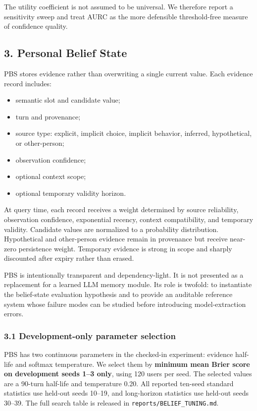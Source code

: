 The utility coefficient is not assumed to be universal. We therefore
report a sensitivity sweep and treat AURC as the more defensible
threshold-free measure of confidence quality.

\subsection{3. Personal Belief State}\label{personal-belief-state}

PBS stores evidence rather than overwriting a single current value. Each
evidence record includes:

\begin{itemize}
\tightlist
\item
  semantic slot and candidate value;
\item
  turn and provenance;
\item
  source type: explicit, implicit choice, implicit behavior, inferred,
  hypothetical, or other-person;
\item
  observation confidence;
\item
  optional context scope;
\item
  optional temporary validity horizon.
\end{itemize}

At query time, each record receives a weight determined by source
reliability, observation confidence, exponential recency, context
compatibility, and temporary validity. Candidate values are normalized
to a probability distribution. Hypothetical and other-person evidence
remain in provenance but receive near-zero persistence weight. Temporary
evidence is strong in scope and sharply discounted after expiry rather
than erased.

PBS is intentionally transparent and dependency-light. It is not
presented as a replacement for a learned LLM memory module. Its role is
twofold: to instantiate the belief-state evaluation hypothesis and to
provide an auditable reference system whose failure modes can be studied
before introducing model-extraction errors.

\subsubsection{3.1 Development-only parameter
selection}\label{development-only-parameter-selection}

PBS has two continuous parameters in the checked-in experiment: evidence
half-life and softmax temperature. We select them by \textbf{minimum
mean Brier score on development seeds 1--3 only}, using 120 users per
seed. The selected values are a 90-turn half-life and temperature 0.20.
All reported ten-seed standard statistics use held-out seeds 10--19, and
long-horizon statistics use held-out seeds 30--39. The full search table
is released in \texttt{reports/BELIEF\_TUNING.md}.

